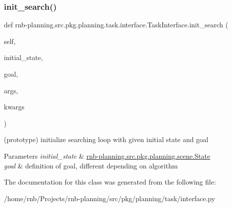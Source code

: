 \subsubsection{\texorpdfstring{init\+\_\+search()}{init\_search()}}
{\footnotesize\ttfamily def rnb-\/planning.\+src.\+pkg.\+planning.\+task.\+interface.\+Task\+Interface.\+init\+\_\+search (\begin{DoxyParamCaption}\item[{}]{self,  }\item[{}]{initial\+\_\+state,  }\item[{}]{goal,  }\item[{}]{args,  }\item[{}]{kwargs }\end{DoxyParamCaption})}



(prototype) initialize searching loop with given initial state and goal 


\begin{DoxyParams}{Parameters}
{\em initial\+\_\+state} & \hyperlink{classrnb-planning_1_1src_1_1pkg_1_1planning_1_1scene_1_1_state}{rnb-\/planning.\+src.\+pkg.\+planning.\+scene.\+State} \\
\hline
{\em goal} & definition of goal, different depending on algorithm \\
\hline
\end{DoxyParams}


The documentation for this class was generated from the following file\+:\begin{DoxyCompactItemize}
\item 
/home/rnb/\+Projects/rnb-\/planning/src/pkg/planning/task/interface.\+py\end{DoxyCompactItemize}
